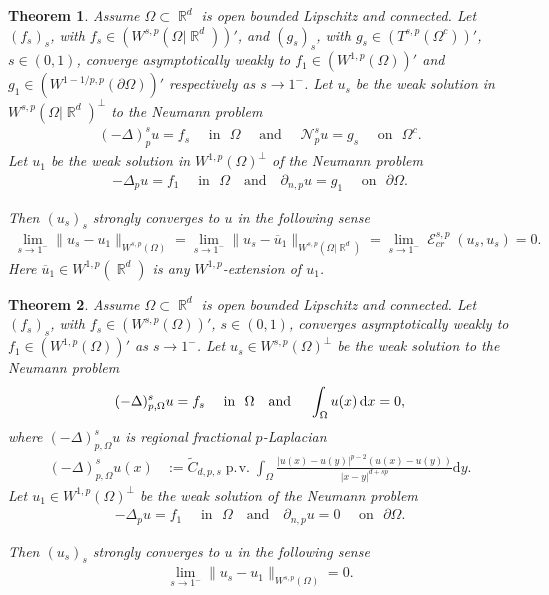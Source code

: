 \documentclass[12pt, reqno]{amsart}%
\theoremstyle{plain}  %
\newtheorem{theorem}{Theorem}[section]
\theoremstyle{definition}  %
\numberwithin{equation}{section}
\DeclareMathOperator{\pv}{\operatorname{p.\!v.}}
\DeclareMathOperator{\cE}{\mathcal{E}}
\DeclareMathOperator{\R}{\mathbb{R}}
\renewcommand{\d}{\mathrm{d}}
\begin{document}
\begin{theorem}\label{thm:convergence-neumann-frac}
Assume $\Omega\subset \R^d$ is open bounded Lipschitz and connected. Let $ (f_s)_s$, with  $f_s\in  (W^{s,p}(\Omega|\R^d))'$, and $ (g_s)_s$, with $g_s\in  (T^{s,p}(\Omega^c))'$, $s\in (0,1)$, converge asymptotically weakly to  $f_1\in (W^{1,p}(\Omega))'$ and
$g_1\in( W^{1-1/p ,p}(\partial\Omega))'$ respectively as $s\to1^-$. Let  $u_s $ be the weak solution in $W^{s,p}(\Omega|\R^d)^\perp$ to the Neumann problem
\begin{align*}
(-\Delta)^s_p u = f_s \quad \text{ in } \,\, \Omega
\quad \text{ and } \quad
\mathcal{N}^s_p u = g_s \quad \text{ on } \,\, \Omega^c .
\end{align*}
Let $u_1$ be the  weak solution in $W^{1,p}(\Omega)^\perp$ of  the Neumann problem
\begin{align*}
-\Delta_p u = f_1 \quad \text{ in }\,\,  \Omega
\quad \text{and} \quad
\partial_{n,p} u = g_1 \quad \text{ on } \,\, \partial \Omega .
\end{align*}

\noindent Then $(u_s)_s$ strongly converges to $u$ in the following sense
\begin{align*}
\lim_{s\to1^-}\|u_s -u_1\|_{W^{s,p}(\Omega)} = \lim_{s\to1^-}\|u_s- \overline{u}_1\|_{W^{s,p}(\Omega|\R^d)}= \lim_{s\to1^-} \cE^{s,p}_{cr}(u_s, u_s)=0.
\end{align*}
Here $\overline{u}_1\in W^{1,p}(\R^d)$ is any $W^{1,p}$-extension of $u_1$.
\end{theorem}


\begin{theorem}\label{thm:converregio-frac}
Assume $\Omega\subset \R^d$ is open bounded Lipschitz and connected. Let $ (f_s)_s$, with  $f_s\in  (W^{s,p}(\Omega))'$, $s\in (0,1)$, converges asymptotically weakly to  $f_1\in (W^{1,p}(\Omega))'$ as $s\to1^-$.   Let  $u_s \in  W^{s,p}(\Omega)^\perp$ be the weak solution to the Neumann problem
\begin{align*}
(-\Delta)^s_{p,\Omega}u= f_{s}\quad
\text{ in\,\,  $\Omega$ \,\, and } \quad  \int_\Omega u(x) \, \d x=0,
\end{align*}
where $(-\Delta)^s_{p,\Omega}u$ is regional fractional $p$-Laplacian
\begin{align*}
(-\Delta)^s_{p,\Omega}u(x)&:=\widetilde{C}_{d,p,s}\pv \int_{\Omega}\frac{|u(x)-u(y)|^{p-2}(u(x)-u(y))}{|x-y|^{d+sp}}\d y.
\end{align*}
Let $u_1\in W^{1,p}(\Omega)^\perp$ be the  weak solution of  the Neumann problem
\begin{align*}
-\Delta_p u = f_1 \quad \text{ in } \,\, \Omega
\quad \text{and} \quad
\partial_{n,p} u = 0 \quad \text{ on } \,\, \partial \Omega .
\end{align*}

\noindent Then $(u_s)_s$ strongly converges to $u$ in the following sense
\begin{align*}
\lim_{s\to1^-}\|u_s -u_1\|_{W^{s,p}(\Omega)} = 0.
\end{align*}
\end{theorem}
\end{document}
